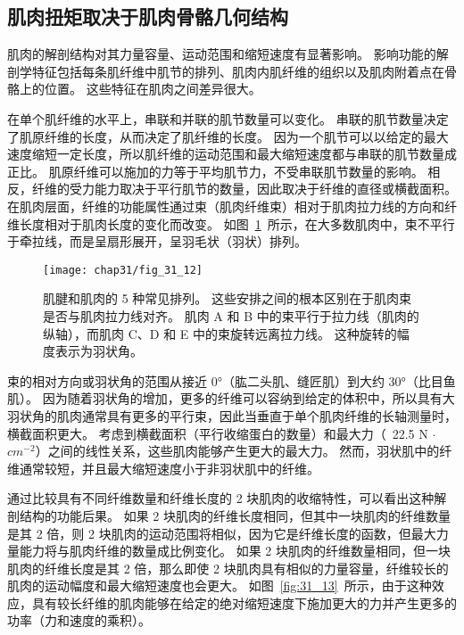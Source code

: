 \subsection{肌肉扭矩取决于肌肉骨骼几何结构}

肌肉的解剖结构对其力量容量、运动范围和缩短速度有显著影响。
影响功能的解剖学特征包括每条肌纤维中肌节的排列、肌肉内肌纤维的组织以及肌肉附着点在骨骼上的位置。
这些特征在肌肉之间差异很大。


在单个肌纤维的水平上，串联和并联的肌节数量可以变化。
串联的肌节数量决定了肌原纤维的长度，从而决定了肌纤维的长度。
因为一个肌节可以以给定的最大速度缩短一定长度，所以肌纤维的运动范围和最大缩短速度都与串联的肌节数量成正比。
肌原纤维可以施加的力等于平均肌节力，不受串联肌节数量的影响。
相反，纤维的受力能力取决于平行肌节的数量，因此取决于纤维的直径或横截面积。
在肌肉层面，纤维的功能属性通过束（肌肉纤维束）相对于肌肉拉力线的方向和纤维长度相对于肌肉长度的变化而改变。
如图~\ref{fig:31_12}~所示，在大多数肌肉中，束不平行于牵拉线，而是呈扇形展开，呈羽毛状（羽状）排列。


\begin{figure}[htbp]
	\centering
	\texttt{[image: chap31/fig\_31\_12]}
	\caption{肌腱和肌肉的 5 种常见排列。
	这些安排之间的根本区别在于肌肉束是否与肌肉拉力线对齐。
	肌肉 A 和 B 中的束平行于拉力线（肌肉的纵轴），而肌肉 C、D 和 E 中的束旋转远离拉力线。
	这种旋转的幅度表示为羽状角\cite{winters2012multiple}。}
	\label{fig:31_12}
\end{figure}


束的相对方向或羽状角的范围从接近 0°（肱二头肌、缝匠肌）到大约 30°（比目鱼肌）。
因为随着羽状角的增加，更多的纤维可以容纳到给定的体积中，所以具有大羽状角的肌肉通常具有更多的平行束，因此当垂直于单个肌肉纤维的长轴测量时，横截面积更大。
考虑到横截面积（平行收缩蛋白的数量）和最大力（~22.5 N $\cdot$ $ cm^{-2} $）之间的线性关系，这些肌肉能够产生更大的最大力。
然而，羽状肌中的纤维通常较短，并且最大缩短速度小于非羽状肌中的纤维。


通过比较具有不同纤维数量和纤维长度的 2 块肌肉的收缩特性，可以看出这种解剖结构的功能后果。
如果 2 块肌肉的纤维长度相同，但其中一块肌肉的纤维数量是其 2 倍，则 2 块肌肉的运动范围将相似，因为它是纤维长度的函数，但最大力量能力将与肌肉纤维的数量成比例变化。
如果 2 块肌肉的纤维数量相同，但一块肌肉的纤维长度是其 2 倍，那么即使 2 块肌肉具有相似的力量容量，纤维较长的肌肉的运动幅度和最大缩短速度也会更大。
如图~\ref{fig:31_13}~所示，由于这种效应，具有较长纤维的肌肉能够在给定的绝对缩短速度下施加更大的力并产生更多的功率（力和速度的乘积）。


